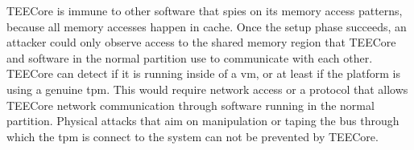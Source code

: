TEECore is immune to other software that spies on its memory access patterns,
because all memory accesses happen in cache. Once the setup phase succeeds, an
attacker could only observe access to the shared memory region that TEECore and
software in the normal partition use to communicate with each other.\\

TEECore can detect if it is running inside of a \gls{vm}, or at least if the
platform is using a genuine \gls{tpm}. This would require network access or a
protocol that allows TEECore network communication through software running in
the normal partition. Physical attacks that aim on manipulation or taping the
bus through which the \gls{tpm} is connect to the system can not be prevented by
TEECore.


\cleardoublepage

